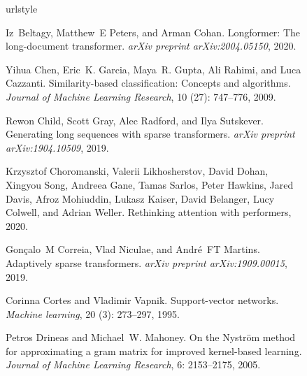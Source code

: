\documentclass{article}
\begin{document}
\begin{figure}[t]
\begin{center}

\begin{thebibliography}{29}
\providecommand{\natexlab}[1]{#1}
\providecommand{\url}[1]{\texttt{#1}}
\expandafter\ifx\csname urlstyle\endcsname\relax
  \providecommand{\doi}[1]{doi: #1}\else
  \providecommand{\doi}{doi: \begingroup \urlstyle{rm}\Url}\fi

Iz~Beltagy, Matthew~E Peters, and Arman Cohan.
\newblock Longformer: The long-document transformer.
\newblock \emph{arXiv preprint arXiv:2004.05150}, 2020.

Yihua Chen, Eric~K. Garcia, Maya~R. Gupta, Ali Rahimi, and Luca Cazzanti.
\newblock Similarity-based classification: Concepts and algorithms.
\newblock \emph{Journal of Machine Learning Research}, 10
  (27): 747--776, 2009.

Rewon Child, Scott Gray, Alec Radford, and Ilya Sutskever.
\newblock Generating long sequences with sparse transformers.
\newblock \emph{arXiv preprint arXiv:1904.10509}, 2019.

Krzysztof Choromanski, Valerii Likhosherstov, David Dohan, Xingyou Song,
  Andreea Gane, Tamas Sarlos, Peter Hawkins, Jared Davis, Afroz Mohiuddin,
  Lukasz Kaiser, David Belanger, Lucy Colwell, and Adrian Weller.
\newblock Rethinking attention with performers, 2020.

Gon{\c{c}}alo~M Correia, Vlad Niculae, and Andr{\'e}~FT Martins.
\newblock Adaptively sparse transformers.
\newblock \emph{arXiv preprint arXiv:1909.00015}, 2019.

Corinna Cortes and Vladimir Vapnik.
\newblock Support-vector networks.
\newblock \emph{Machine learning}, 20 (3): 273--297, 1995.

Petros Drineas and Michael~W. Mahoney.
\newblock On the {N}ystr\"om method for approximating a gram matrix for
  improved kernel-based learning.
\newblock \emph{Journal of Machine Learning Research}, 6: 2153--2175,
  2005.


\end{thebibliography}
\end{center}
\end{figure}
\end{document}
